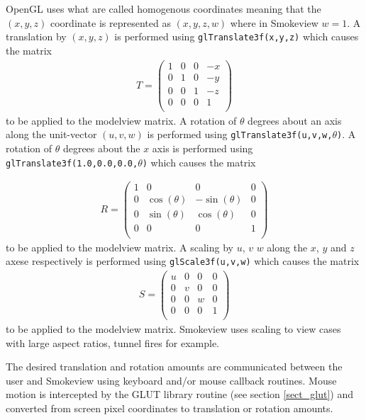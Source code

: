 OpenGL uses what are called homogenous coordinates meaning that
the $(x,y,z)$ coordinate is represented as $(x,y,z,w)$ where in
Smokeview $w=1$.  A translation by $(x,y,z)$ is performed using
{\tt glTranslate3f(x,y,z)} which causes the matrix
\begin{eqnarray*}
T=\left(%
\begin{array}{cccc}
  1 & 0 & 0 & -x \\
  0 & 1 & 0 & -y \\
  0 & 0 & 1 & -z \\
  0 & 0 & 0 & 1 \\
\end{array}%
\right)
\end{eqnarray*}
to be applied to the modelview matrix.  A rotation of $\theta$
degrees about an axis along the unit-vector $(u,v,w)$ is performed
using {\tt glTranslate3f(u,v,w,$\theta$)}.  A rotation of $\theta$
degrees about the $x$ axis is performed using {\tt
glTranslate3f(1.0,0.0,0.0,$\theta$)} which causes the matrix

\begin{eqnarray*}
R=\left(%
\begin{array}{cccc}
  1 & 0 & 0 & 0 \\
  0 & \cos(\theta) & -\sin(\theta) & 0 \\
  0 & \sin(\theta) & \cos(\theta) & 0 \\
  0 & 0 & 0 & 1 \\
\end{array}%
\right)
\end{eqnarray*}
to be applied to the modelview matrix.  A scaling by $u$, $v$ $w$
along the $x$, $y$ and $z$ axese respectively is performed using
{\tt glScale3f(u,v,w)} which causes the matrix
\begin{eqnarray*}
S=\left(%
\begin{array}{cccc}
  u & 0 & 0 & 0 \\
  0 & v & 0 & 0 \\
  0 & 0 & w & 0 \\
  0 & 0 & 0 & 1 \\
\end{array}%
\right)
\end{eqnarray*}
to be applied to the modelview matrix.  Smokeview uses scaling to
view cases with large aspect ratios, tunnel fires for example.

The desired translation and rotation amounts are communicated
between the user and Smokeview using keyboard and/or mouse
callback routines.  Mouse motion is intercepted by the GLUT
library routine (see section \ref{sect_glut}) and converted from
screen pixel coordinates to translation or rotation amounts.


